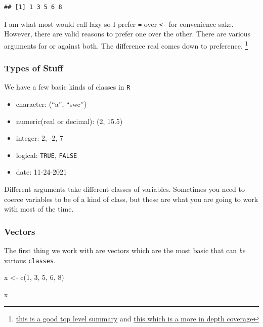 \documentclass[]{tufte-handout}
\newenvironment{Shaded}{}{}
\newcommand{\DecValTok}[1]{\textcolor[rgb]{0.25,0.63,0.44}{#1}}
\newcommand{\FunctionTok}[1]{\textcolor[rgb]{0.02,0.16,0.49}{#1}}
\newcommand{\NormalTok}[1]{#1}
\newcommand{\OtherTok}[1]{\textcolor[rgb]{0.00,0.44,0.13}{#1}}
\providecommand{\tightlist}{%
  \setlength{\itemsep}{0pt}\setlength{\parskip}{0pt}}
\begin{document}
\begin{verbatim}
## [1] 1 3 5 6 8
\end{verbatim}

I am what most would call lazy so I prefer \texttt{=} over
\texttt{\textless{}-} for convenience sake. However, there are valid
reasons to prefer one over the other. There are various arguments for or
against both. The difference real comes down to preference. \footnote{\href{https://github.com/Robinlovelace/geocompr/issues/319\#issuecomment-427376764}{this
  is a good top level summary} and
  \href{https://www.separatinghyperplanes.com/2018/02/why-you-should-use-and-never.html}{this
  which is a more in depth coverage}}

\hypertarget{types-of-stuff}{%
\subsubsection{Types of Stuff}\label{types-of-stuff}}

We have a few basic kinds of classes in \texttt{R}

\begin{itemize}
\tightlist
\item
  character: (``a'', ``swc'')
\item
  numeric(real or decimal): (2, 15.5)
\item
  integer: 2, -2, 7
\item
  logical: \texttt{TRUE}, \texttt{FALSE}
\item
  date: 11-24-2021
\end{itemize}

Different arguments take different classes of variables. Sometimes you
need to coerce variables to be of a kind of class, but these are what
you are going to work with most of the time.

\hypertarget{vectors}{%
\subsubsection{Vectors}\label{vectors}}

The first thing we work with are vectors which are the most basic that
can \emph{be} various \texttt{classes}.

\begin{Shaded}
\begin{Highlighting}[]
\NormalTok{x }\OtherTok{\textless{}{-}} \FunctionTok{c}\NormalTok{(}\DecValTok{1}\NormalTok{, }\DecValTok{3}\NormalTok{, }\DecValTok{5}\NormalTok{, }\DecValTok{6}\NormalTok{, }\DecValTok{8}\NormalTok{)}

\NormalTok{x}
\end{Highlighting}
\end{Shaded}
\end{document}
